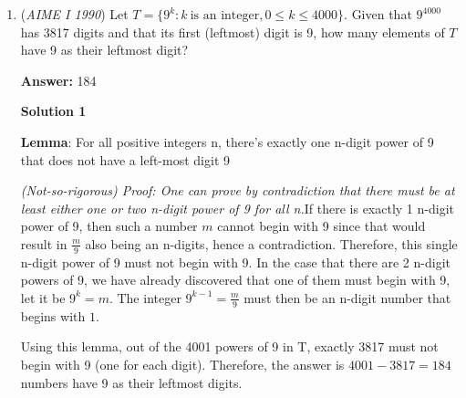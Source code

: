 \begin{enumerate}
 



\textbf{Solution 4 (Another Way to Start Solution 1)}

Plotting this regular $12$-gon on the complex plane with center as origin, and a vertex on the $x$-axis. We have that the vertices are the of the form $12e^{\frac{2\pi k}{12} i}.$ All of the distinct diagonals can be represented with one vertex as $12e^{\frac{2\pi 0}{12} i} = 12.$ Then the each diagonal can be expressed as, 
 \begin{align*} 12 \sqrt{(\cos{0} - \cos{\frac{2\pi k}{12}})^2 + (\sin{\frac{2\pi k}{12}} - \sin{0})^2} &=  12 \sqrt{(\cos{0})^2 + (\cos{\frac{2\pi k}{12}})^2 + (\sin{\frac{2\pi k}{12}})^2 + (\sin{0})^2 - 2(\cos{\frac{2\pi k}{12}}\cos{0} + \sin{\frac{2\pi k}{12}}\sin{0})} \\ &= 12 \sqrt{2 - 2\cos{\frac{2\pi k}{12}}} \\ &= 12 \sqrt{4\sin^2{\frac{\pi k}{12}}} \\ &= 24\sin{\frac{\pi k}{12}}.\end{align*}
 The rest follows as Solution 1.

 


	\item (\textit{AIME I 1990}) Let $T = \{9^k : k ~ \mbox{is an integer}, 0 \le k \le 4000\}$.  Given that $9^{4000}_{}$ has 3817 digits and that its first (leftmost) digit is 9, how many elements of $T_{}^{}$ have 9 as their leftmost digit?


 
 \textbf{Answer: }184



\textbf{Solution 1}

\textbf{Lemma}: For all positive integers n, there's exactly one n-digit power of 9 that does not have a left-most digit 9

 \textit{(Not-so-rigorous) Proof: One can prove by contradiction that there must be at least either one or two n-digit power of 9 for all n.}If there is exactly 1 n-digit power of 9, then such a number $m$ cannot begin with 9 since that would result in $\frac{m}{9}$ also being an n-digits, hence a contradiction. Therefore, this single n-digit power of 9 must not begin with 9. In the case that there are 2 n-digit powers of 9, we have already discovered that one of them must begin with 9, let it be $9^k = m$. The integer $9^{k - 1} = \frac{m}{9}$ must then be an n-digit number that begins with $1$. \textit{}

 
Using this lemma, out of the 4001 powers of 9 in T, exactly 3817 must not begin with 9 (one for each digit). Therefore, the answer is $4001 - 3817 = \boxed{184}$ numbers have 9 as their leftmost digits.


\end{enumerate}
